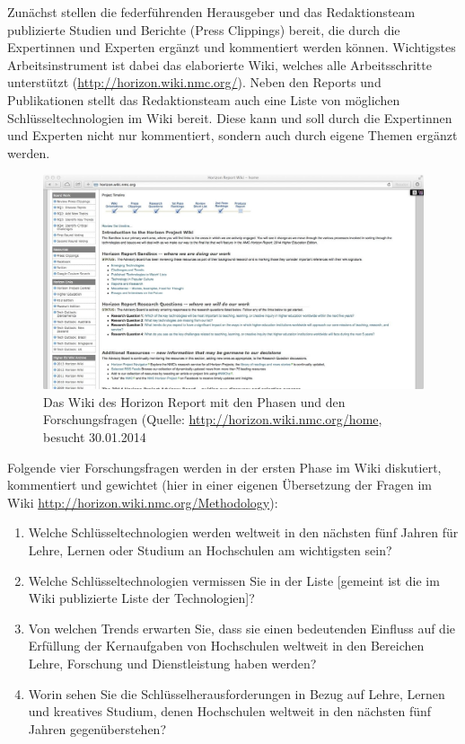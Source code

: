 \documentclass[a4paper,
fontsize=11pt,
oneside,
numbers=noperiodatend,
parskip=half-,
bibliography=totoc,
final
]{scrartcl}
\begin{document}
Zunächst stellen die federführenden Herausgeber und das Redaktionsteam
publizierte Studien und Berichte (Press Clippings) bereit, die durch die
Expertinnen und Experten ergänzt und kommentiert werden können.
Wichtigstes Arbeitsinstrument ist dabei das elaborierte Wiki, welches
alle Arbeitsschritte unterstützt
(\href{http://horizon.wiki.nmc.org}{http://horizon.wiki.nmc.org/}).
Neben den Reports und Publikationen stellt das Redaktionsteam auch eine
Liste von möglichen Schlüsseltechnologien im Wiki bereit. Diese kann und
soll durch die Expertinnen und Experten nicht nur kommentiert, sondern
auch durch eigene Themen ergänzt werden.

\begin{figure}[htbp]
\centering
\includegraphics{./img/01-Horizon_Wiki.jpg}
\caption{Das Wiki des Horizon Report mit den Phasen und den
Forschungsfragen (Quelle: \url{http://horizon.wiki.nmc.org/home},
besucht 30.01.2014}
\end{figure}

Folgende vier Forschungsfragen werden in der ersten Phase im Wiki
diskutiert, kommentiert und gewichtet (hier in einer eigenen Übersetzung
der Fragen im Wiki \url{http://horizon.wiki.nmc.org/Methodology}):~

\begin{enumerate}
\def\labelenumi{\arabic{enumi}.}
\item
  Welche Schlüsseltechnologien werden weltweit in den nächsten fünf
  Jahren für Lehre, Lernen oder Studium an Hochschulen am wichtigsten
  sein?
\item
  Welche Schlüsseltechnologien vermissen Sie in der Liste {[}gemeint ist
  die im Wiki publizierte Liste der Technologien{]}?
\item
  Von welchen Trends erwarten Sie, dass sie einen bedeutenden Einfluss
  auf die Erfüllung der Kernaufgaben von Hochschulen weltweit in den
  Bereichen Lehre, Forschung und Dienstleistung haben werden?
\item
  Worin sehen Sie die Schlüsselherausforderungen in Bezug auf Lehre,
  Lernen und kreatives Studium, denen Hochschulen weltweit in den
  nächsten fünf Jahren gegenüberstehen?
\end{enumerate}
\end{document}
